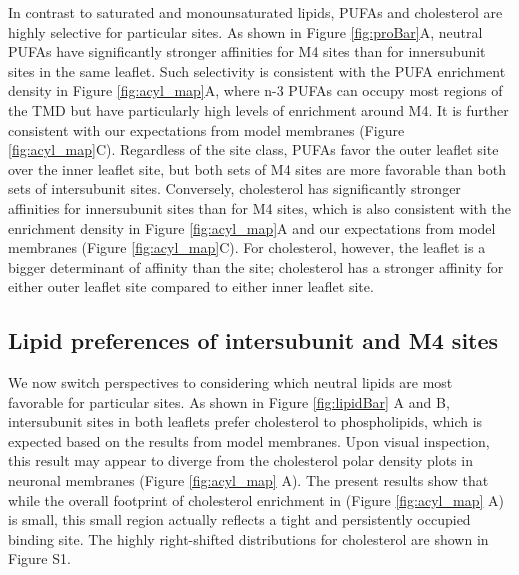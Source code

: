In contrast to saturated and monounsaturated lipids, PUFAs and cholesterol are highly selective for particular sites.  As shown in Figure  \ref{fig:proBar}A, neutral PUFAs have significantly stronger affinities for M4 sites than for innersubunit sites in the same leaflet.  Such selectivity is consistent with the PUFA enrichment density in Figure \ref{fig:acyl_map}A, where n-3 PUFAs can occupy most regions of the TMD but have particularly high levels of enrichment around M4. It is further consistent with our expectations from model membranes (Figure \ref{fig:acyl_map}C). Regardless of the site class, PUFAs favor the outer leaflet site over the inner leaflet site, but both sets of M4 sites are more favorable than both sets of intersubunit sites.  Conversely, cholesterol has significantly stronger affinities for innersubunit sites than for M4 sites, which is also consistent with the enrichment density in Figure \ref{fig:acyl_map}A and our expectations from model membranes (Figure \ref{fig:acyl_map}C). For cholesterol, however, the leaflet is a bigger determinant of affinity than the site; cholesterol has a stronger affinity for either outer leaflet site compared to either inner leaflet site.  

\subsection{Lipid preferences of intersubunit and M4 sites}
We now switch perspectives to considering which neutral lipids are most favorable for particular sites. As shown in Figure \ref{fig:lipidBar} A and B, intersubunit sites in both leaflets prefer cholesterol to phospholipids, which is expected based on the results from model membranes.  Upon visual inspection, this result may appear to diverge from the cholesterol polar density plots in neuronal membranes (Figure \ref{fig:acyl_map} A).  The present results show that while the overall footprint of cholesterol enrichment in (Figure \ref{fig:acyl_map} A) is small, this small region actually reflects a tight and persistently occupied binding site.  The highly right-shifted distributions for cholesterol are shown in Figure S1.  %

